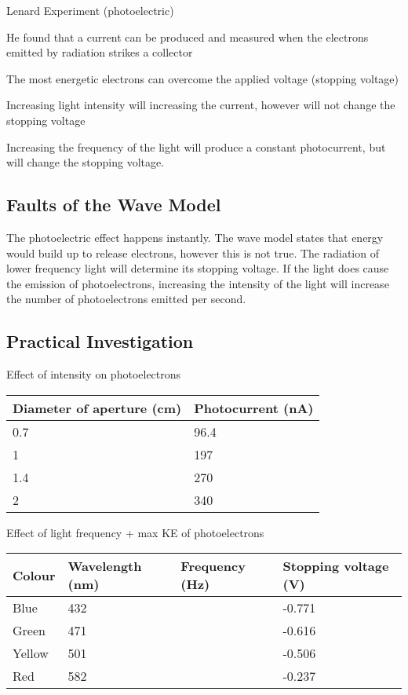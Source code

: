 		Lenard Experiment (photoelectric)
		
		He found that a current can be produced and measured when the electrons emitted by radiation strikes a collector

		The most energetic electrons can overcome the applied voltage (stopping voltage)

		Increasing light intensity will increasing the current, however will not change the stopping voltage

		Increasing the frequency of the light will produce a constant photocurrent, but will change the stopping voltage.

	\subsection{Faults of the Wave Model}
	
		The photoelectric effect happens instantly. The wave model states that energy would build up to release electrons, however this is not true. The radiation of lower frequency light will determine its stopping voltage. If the light does cause the emission of photoelectrons, increasing the intensity of the light will increase the number of photoelectrons emitted per second.
\newpage

	\subsection{Practical Investigation}

		Effect of intensity on photoelectrons
	
		\begin{table}[H]
			\centering
			\begin{tabular}{p{7cm}|p{7cm}}
				\textbf{Diameter of aperture (cm)}	& \textbf{Photocurrent (nA)}	\\ \hline
				0.7					& 96.4				\\
				1					& 197				\\
				1.4					& 270				\\
				2					& 340				\\

			\end{tabular}
		\end{table}
		
		Effect of light frequency + max KE of photoelectrons
		\begin{table}[H]
			\centering
			\begin{tabular}{p{2cm}|p{3.5cm}|p{3.5cm}|p{4cm}}
				\textbf{Colour}	& \textbf{Wavelength (nm)}	& \textbf{Frequency (Hz)}	& \textbf{Stopping voltage (V)} \\ \hline
				Blue		& 432				& 				& -0.771			\\
				Green		& 471				& 				& -0.616			\\
				Yellow		& 501				& 				& -0.506			\\
				Red		& 582 				& 				& -0.237			\\
			\end{tabular}
		\end{table}

